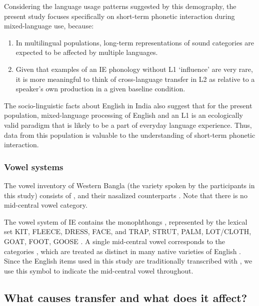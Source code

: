 \documentclass[12 pt]{article}
\newcommand{\nt}[1]{\textipa{[#1]}} %
\begin{document}
Considering the language usage patterns suggested by this demography, the present study focuses specifically on short-term phonetic interaction during mixed-language use, because:

\begin{enumerate}[label=(\roman*)]
	\item In multilingual populations, long-term representations of sound categories are expected to be affected by multiple languages. 
	\item Given that examples of an IE phonology without L1 `influence' are very rare, it is more meaningful to think of cross-language transfer in L2 as relative to a speaker's own production in a given baseline condition.
\end{enumerate}

The socio-linguistic facts about English in India also suggest that for the present population, mixed-language processing of English and an L1 is an ecologically valid paradigm that is likely to be a part of everyday language experience. Thus, data from this population is valuable to the understanding of short-term phonetic interaction.

\subsubsection*{Vowel systems} \label{vowel systems}
The vowel inventory of Western Bangla (the variety spoken by the participants in this study) consists of \nt{i, e, \ae, a, O, o, u}, and their nasalized counterparts \citep{garry2001facts}. Note that there is no mid-central vowel category. 


The vowel system of IE contains the monophthongs \nt{I, i, E, e, \ae, @/2, a:, O, o, U, u}, represented by the lexical set KIT, FLEECE, DRESS, FACE, and TRAP, STRUT, PALM, LOT/CLOTH, GOAT, FOOT, GOOSE \citep{wells1982accents, masica1972sound}. %
A single mid-central vowel corresponds to the categories \nt{2,@,3:}, which are treated as distinct in many native varieties of English \citep{nihalani1979indian,wells1982accents,hickey2005legacies,bansal1969intelligibility}. Since the English items used in this study are traditionally transcribed with \nt{2}, we use this symbol to indicate the mid-central vowel throughout. 
 

\subsection{What causes transfer and what does it affect?}\label{causes}
\end{document}
